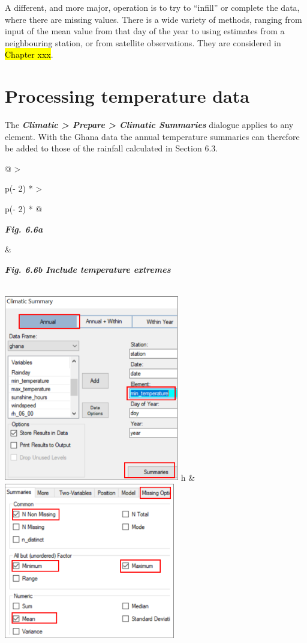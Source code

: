 \documentclass[
  letterpaper,
  DIV=11,
  numbers=noendperiod]{scrreprt}
\begin{document}
A different, and more major, operation is to try to ``infill'' or
complete the data, where there are missing values. There is a wide
variety of methods, ranging from input of the mean value from that day
of the year to using estimates from a neighbouring station, or from
satellite observations. They are considered in \hl{Chapter xxx}.

\section{Processing temperature data}\label{processing-temperature-data}

The \textbf{\emph{Climatic \textgreater{} Prepare \textgreater{}
Climatic Summaries}} dialogue applies to any element. With the Ghana
data the annual temperature summaries can therefore be added to those of
the rainfall calculated in Section 6.3.

\begin{longtable}[]{@{}
  >{\raggedright\arraybackslash}p{(\columnwidth - 2\tabcolsep) * }
  >{\raggedright\arraybackslash}p{(\columnwidth - 2\tabcolsep) * }@{}}
\toprule\noalign{}
\begin{minipage}[b]{\linewidth}\raggedright
\textbf{\emph{Fig. 6.6a}}
\end{minipage} & \begin{minipage}[b]{\linewidth}\raggedright
\textbf{\emph{Fig. 6.6b Include temperature extremes}}
\end{minipage} \\
\midrule\noalign{}
\endhead
\bottomrule\noalign{}
\endlastfoot
\includegraphics[width=3.01254in,height=3.21036in]{figures/Fig6.6a.png}
h &
\includegraphics[width=2.93647in,height=\textheight]{figures/Fig6.6b.png} \\
\end{longtable}
\end{document}
